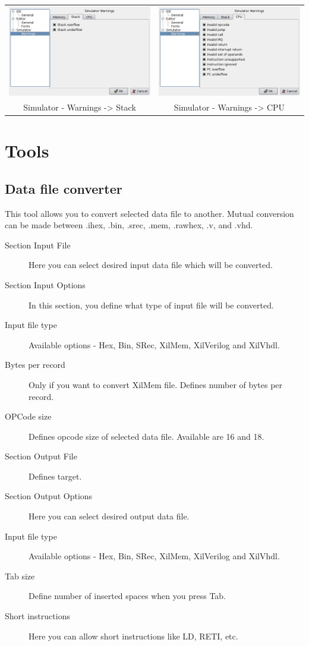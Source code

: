 \begin{table}[h!]
\begin{tabular}{cc}
                \includegraphics[width=.4\textwidth]{img/interface5.png}
                    &
                \includegraphics[width=.4\textwidth]{img/interface6.png}
                    \\
                Simulator - Warnings -> Stack & Simulator - Warnings -> CPU
            \end{tabular}
        \end{table}

\clearpage
\section{Tools}
    \subsection{Data file converter}
        This tool allows you to convert selected data file to another. Mutual conversion can be made between .ihex, .bin,
        .srec, .mem, .rawhex, .v, and .vhd.
        \begin{description}
            \item[Section Input File] Here you can select desired input data file which will be converted.
            \item[Section Input Options] In this section, you define what type of input file will be converted.
            \item[Input file type] Available options - Hex, Bin, SRec, XilMem, XilVerilog and XilVhdl.
            \item[Bytes per record] Only if you want to convert XilMem file. Defines number of bytes per record.
            \item[OPCode size] Defines opcode size of selected data file. Available are 16 and 18.
            \item[Section Output File] Defines target.
            \item[Section Output Options] Here you can select desired output data file.
            \item[Input file type] Available options - Hex, Bin, SRec, XilMem, XilVerilog and XilVhdl.
            \item[Tab size]  Define number of inserted spaces when you press Tab.
            \item[Short instructions] Here you can allow short instructions like LD, RETI, etc.
        \end{description}

